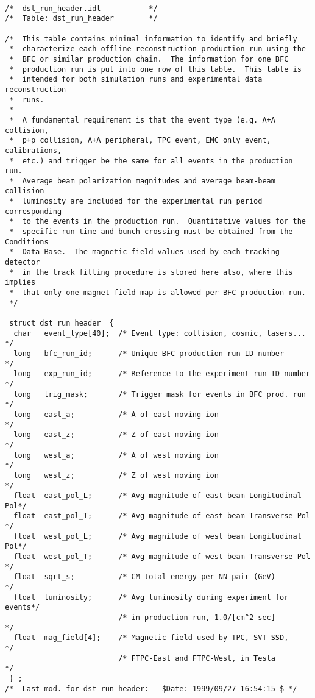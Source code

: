 \begin{verbatim}

/*  dst_run_header.idl           */    
/*  Table: dst_run_header        */  

/*  This table contains minimal information to identify and briefly
 *  characterize each offline reconstruction production run using the
 *  BFC or similar production chain.  The information for one BFC
 *  production run is put into one row of this table.  This table is
 *  intended for both simulation runs and experimental data reconstruction
 *  runs.
 *
 *  A fundamental requirement is that the event type (e.g. A+A collision,
 *  p+p collision, A+A peripheral, TPC event, EMC only event, calibrations,
 *  etc.) and trigger be the same for all events in the production run.
 *  Average beam polarization magnitudes and average beam-beam collision 
 *  luminosity are included for the experimental run period corresponding
 *  to the events in the production run.  Quantitative values for the 
 *  specific run time and bunch crossing must be obtained from the Conditions 
 *  Data Base.  The magnetic field values used by each tracking detector
 *  in the track fitting procedure is stored here also, where this implies
 *  that only one magnet field map is allowed per BFC production run.
 */

 struct dst_run_header  {
  char   event_type[40];  /* Event type: collision, cosmic, lasers...   */
  long   bfc_run_id;      /* Unique BFC production run ID number        */
  long   exp_run_id;      /* Reference to the experiment run ID number  */
  long   trig_mask;       /* Trigger mask for events in BFC prod. run   */
  long   east_a;          /* A of east moving ion                       */
  long   east_z;          /* Z of east moving ion                       */
  long   west_a;          /* A of west moving ion                       */
  long   west_z;          /* Z of west moving ion                       */
  float  east_pol_L;      /* Avg magnitude of east beam Longitudinal Pol*/
  float  east_pol_T;      /* Avg magnitude of east beam Transverse Pol  */
  float  west_pol_L;      /* Avg magnitude of west beam Longitudinal Pol*/
  float  west_pol_T;      /* Avg magnitude of west beam Transverse Pol  */
  float  sqrt_s;          /* CM total energy per NN pair (GeV)          */
  float  luminosity;      /* Avg luminosity during experiment for events*/
                          /* in production run, 1.0/[cm^2 sec]          */
  float  mag_field[4];    /* Magnetic field used by TPC, SVT-SSD,       */
                          /* FTPC-East and FTPC-West, in Tesla          */
 } ;
/*  Last mod. for dst_run_header:   $Date: 1999/09/27 16:54:15 $ */

\end{verbatim}

